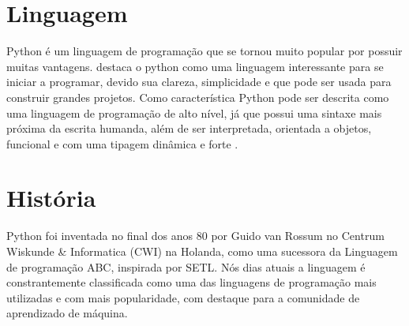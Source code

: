 


\section{Linguagem}
\indent Python é um linguagem de programação que se tornou muito popular por possuir muitas vantagens. \cite{menezes2010introduccao} destaca o python como uma linguagem interessante para se iniciar a programar, devido sua clareza, simplicidade e que pode ser usada para construir grandes projetos. Como característica Python pode ser descrita como uma linguagem de programação de alto nível, já que possui uma sintaxe mais próxima da escrita humanda, além de ser interpretada, orientada a objetos, funcional e com uma tipagem dinâmica e forte \cite{wiki:python}.

\section{História}
\indent Python foi inventada no final dos anos 80 por Guido van Rossum no Centrum Wiskunde & Informatica (CWI) na Holanda, como uma sucessora da Linguagem de programação ABC, inspirada por SETL. Nós dias atuais a linguagem é constrantemente classificada como uma das linguagens de programação mais utilizadas e com mais popularidade, com destaque para a comunidade de aprendizado de máquina. \cite{wiki:python}

